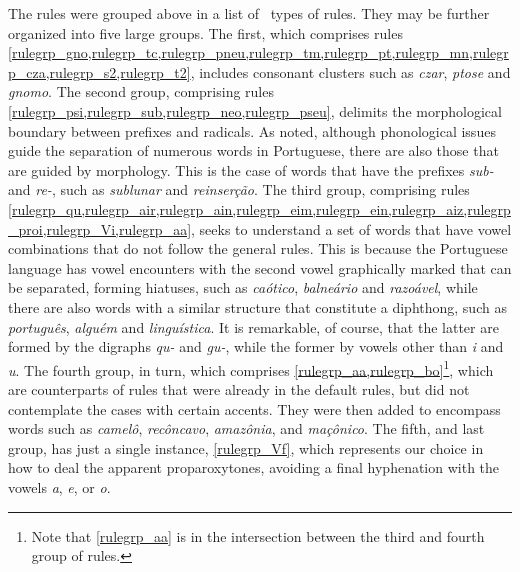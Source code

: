 The \NumberOfNewRules{} rules were grouped above in a list of
\thenumberRulesGroups\ types of rules. They may be further organized into five
large groups. The first, which comprises rules %
\cref{rulegrp_gno,rulegrp_tc,rulegrp_pneu,rulegrp_tm,rulegrp_pt,rulegrp_mn,rulegrp_cza,rulegrp_s2,rulegrp_t2},
includes consonant clusters such as \emph{czar}, \emph{ptose}
and \emph{gnomo}. 
The second group, comprising rules
\cref{rulegrp_psi,rulegrp_sub,rulegrp_neo,rulegrp_pseu},
delimits the morphological boundary
between prefixes and radicals. As noted, although phonological issues guide the
separation of numerous words in Portuguese, there are also those that are
guided by morphology. This is the case of words that have the prefixes
\emph{sub-} and \emph{re-}, such as \emph{sublunar} and \emph{reinserção}. The
third group, comprising rules \cref{rulegrp_qu,rulegrp_air,rulegrp_ain,rulegrp_eim,rulegrp_ein,rulegrp_aiz,rulegrp_proi,rulegrp_Vi,rulegrp_aa}, seeks to
understand a set of words that have vowel combinations that do not follow the
general rules. This is because the Portuguese language has vowel encounters
with the second vowel graphically marked that can be separated, forming
hiatuses, such as \emph{caótico}, \emph{balneário} and \emph{razoável}, while
there are also words with a similar structure that constitute a diphthong, such
as \emph{português}, \emph{alguém} and \emph{linguística}. It is remarkable, of
course, that the latter are formed by the digraphs \emph{qu-} and \emph{gu-},
while the former by vowels other than \emph{i} and \emph{u}. The fourth group, 
in turn, which comprises \cref{rulegrp_aa,rulegrp_bo}\footnote{Note that \cref{rulegrp_aa} is in the intersection
between the third and fourth group of rules.}, 
which are counterparts of rules that were already in the
default rules, but did not contemplate the cases with certain accents. They
were then added to encompass words such as \emph{camelô}, \emph{recôncavo},
\emph{amazônia}, and \emph{maçônico}. 
The fifth, and last group, has just a single instance, \cref{rulegrp_Vf},
which represents our choice in how to deal the apparent proparoxytones,
avoiding a final hyphenation with the vowels \emph{a}, \emph{e}, or \emph{o}.



